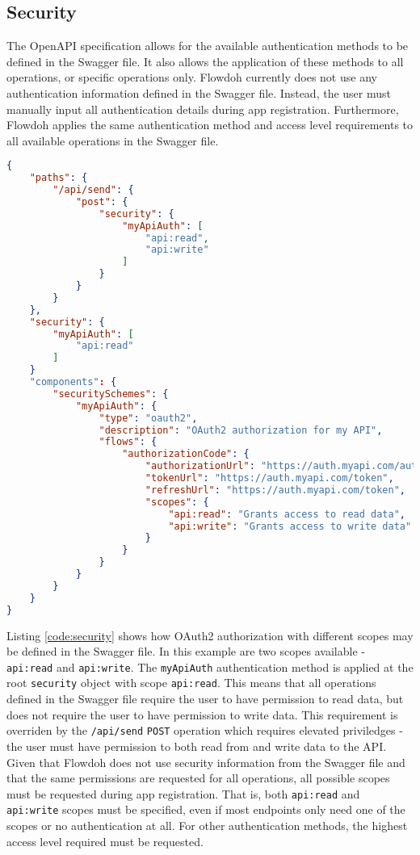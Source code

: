 \subsection{Security}
The OpenAPI specification allows for the available authentication methods to be defined in the Swagger file. It also allows the application of these methods to all operations, or specific operations only. Flowdoh currently does not use any authentication information defined in the Swagger file. Instead, the user must manually input all authentication details during app registration. Furthermore, Flowdoh applies the same authentication method and access level requirements to all available operations in the Swagger file.\\
\begin{minipage}{\textwidth}
\begin{lstlisting}[caption={OAuth2 authorization code flow defined in the Swagger file},label={code:security},language=json]
{
    "paths": {
        "/api/send": {
            "post": {
                "security": {
                    "myApiAuth": [
                        "api:read",
                        "api:write"
                    ]
                }
            }
        }
    },
    "security": {
        "myApiAuth": [
            "api:read"
        ]
    }
    "components": {
        "securitySchemes": {
            "myApiAuth": {
                "type": "oauth2",
                "description": "OAuth2 authorization for my API",
                "flows": {
                    "authorizationCode": {
                        "authorizationUrl": "https://auth.myapi.com/authorize",
                        "tokenUrl": "https://auth.myapi.com/token",
                        "refreshUrl": "https://auth.myapi.com/token",
                        "scopes": {
                            "api:read": "Grants access to read data",
                            "api:write": "Grants access to write data"
                        }
                    }
                }
            }
        }
    }
}
\end{lstlisting}
\end{minipage}
Listing \ref{code:security} shows how OAuth2 authorization with different scopes may be defined in the Swagger file. In this example are two scopes available - \texttt{api:read} and \texttt{api:write}. The \texttt{myApiAuth} authentication method is applied at the root \texttt{security} object with scope \texttt{api:read}. This means that all operations defined in the Swagger file require the user to have permission to read data, but does not require the user to have permission to write data. This requirement is overriden by the \texttt{/api/send} \texttt{POST} operation which requires elevated priviledges - the user must have permission to both read from and write data to the API. Given that Flowdoh does not use security information from the Swagger file and that the same permissions are requested for all operations, all possible scopes must be requested during app registration. That is, both \texttt{api:read} and \texttt{api:write} scopes must be specified, even if most endpoints only need one of the scopes or no authentication at all. For other authentication methods, the highest access level required must be requested.